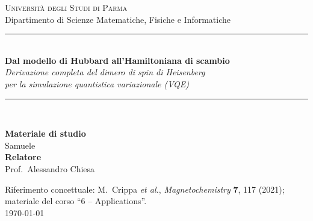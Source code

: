 \documentclass[11pt,a4paper]{article}
\theoremstyle{definition}
\theoremstyle{remark}
\begin{document}
\begin{titlepage}
\centering
\vspace*{2.0cm}
{\Large\scshape Università degli Studi di Parma}\\[0.3cm]
{\large Dipartimento di Scienze Matematiche, Fisiche e Informatiche}\\[2.2cm]
\rule{\linewidth}{0.4pt}\\[0.5cm]
{\LARGE\bfseries Dal modello di Hubbard all'Hamiltoniana di scambio}\\[0.35cm]
{\large\itshape Derivazione completa del dimero di spin di Heisenberg\\ per la simulazione quantistica variazionale (VQE)}\\[0.4cm]
\rule{\linewidth}{0.4pt}\\[1.6cm]

\begin{flushright}
\begin{minipage}{0.5\linewidth}
\begin{flushleft}
\textbf{Materiale di studio}\\
Samuele\\[0.4cm]
\textbf{Relatore}\\
Prof.\ Alessandro Chiesa
\end{flushleft}
\end{minipage}
\end{flushright}

\vfill
{\small Riferimento concettuale: M.~Crippa \textit{et al.}, \textit{Magnetochemistry} \textbf{7}, 117 (2021);\\
materiale del corso ``6 -- Applications''.}\\[0.6cm]
{\small\today}
\end{titlepage}

\tableofcontents
\newpage

\begin{abstract}
\noindent Questo documento ricostruisce in modo \emph{completo e autosufficiente} l'Hamiltoniana di spin
isotropa di tipo Heisenberg che descrive un dimero magnetico, fino alla forma in operatori di Pauli usata
nell'esempio ``VQE on a spin dimer''. Nessun passaggio è dato per acquisito: si verificano le matrici dei
modi fermionici, si calcola l'azione di $H_t$ con tutti i segni di anticommutazione, si deriva la formula
perturbativa del secondo ordine e si valutano esplicitamente i suoi elementi di matrice, si svolge la
diagonalizzazione $2\times2$ (sia per la repulsione $\mathcal P$--$\mathcal Q$ con i suoi $E_\pm$, sia per
l'Hamiltoniana efficace $\mathcal P$--$\mathcal P$), si espandono le approssimazioni indicando i termini
trascurati e il regime di validità, si ricava la mappa sugli operatori di spin che fissa $J=4t^2/U$, e si
deriva infine lo spettro completo del dimero con campo. L'Appendice~\ref{app:spin} richiama l'algebra di
spin-$\tfrac12$ usata nel testo. Ogni passaggio è accompagnato da una figura.
\end{abstract}
\end{document}
